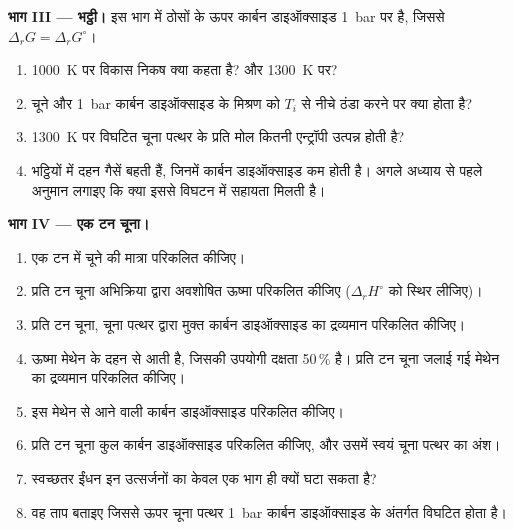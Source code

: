 \begin{problem}
\medskip
\noindent\textbf{भाग III --- भट्ठी।}
इस भाग में ठोसों के ऊपर कार्बन डाइऑक्साइड \qty{1}{bar} पर है, जिससे
$\Delta_r G = \Delta_r G^\circ$।
\begin{enumerate}[resume]
  \item \qty{1000}{K} पर विकास निकष क्या कहता है? और
        \qty{1300}{K} पर?
  \item चूने और \qty{1}{bar} कार्बन डाइऑक्साइड के मिश्रण को
        $T_i$ से नीचे ठंडा करने पर क्या होता है?
  \item \qty{1300}{K} पर विघटित चूना पत्थर के प्रति मोल कितनी एन्ट्रॉपी उत्पन्न
        होती है?
  \item भट्ठियों में दहन गैसें बहती हैं, जिनमें कार्बन डाइऑक्साइड कम होती है।
        अगले अध्याय से पहले अनुमान लगाइए कि क्या इससे
        विघटन में सहायता मिलती है।
\end{enumerate}

\medskip
\noindent\textbf{भाग IV --- एक टन चूना।}
\begin{enumerate}[resume]
  \item एक टन में चूने की मात्रा परिकलित कीजिए।
  \item प्रति टन चूना अभिक्रिया द्वारा अवशोषित ऊष्मा परिकलित कीजिए
        ($\Delta_r H^\circ$ को स्थिर लीजिए)।
  \item प्रति टन चूना, चूना पत्थर द्वारा मुक्त कार्बन डाइऑक्साइड का द्रव्यमान
        परिकलित कीजिए।
  \item ऊष्मा मेथेन के दहन से आती है, जिसकी उपयोगी दक्षता
        50\,\% है। प्रति टन चूना जलाई गई मेथेन का द्रव्यमान परिकलित कीजिए।
  \item इस मेथेन से आने वाली कार्बन डाइऑक्साइड परिकलित कीजिए।
  \item प्रति टन चूना कुल कार्बन डाइऑक्साइड परिकलित कीजिए, और उसमें
        स्वयं चूना पत्थर का अंश।
  \item स्वच्छतर ईंधन इन उत्सर्जनों का केवल एक भाग ही क्यों घटा सकता है?
  \item वह ताप बताइए जिससे ऊपर चूना पत्थर \qty{1}{bar} कार्बन
        डाइऑक्साइड के अंतर्गत विघटित होता है।
\end{enumerate}
\end{problem}
